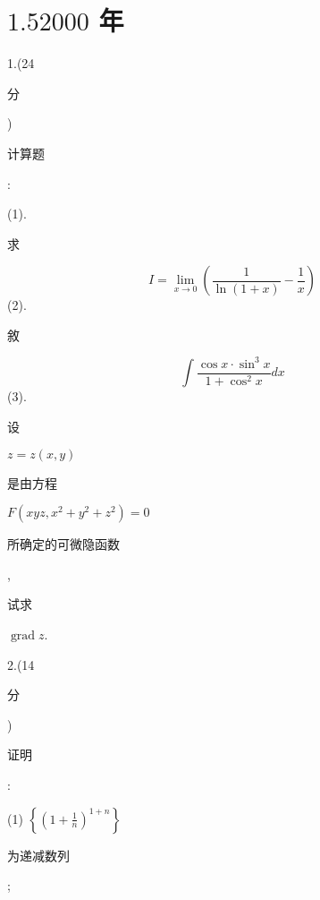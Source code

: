 \documentclass[10pt]{article}
\begin{document}
\section{$1.52000$ 年}
1.(24 \begin{CJK}{UTF8}{mj}分\end{CJK}) \begin{CJK}{UTF8}{mj}计算题\end{CJK}:

(1). \begin{CJK}{UTF8}{mj}求\end{CJK}
$$
I=\lim _{x \rightarrow 0}\left(\frac{1}{\ln (1+x)}-\frac{1}{x}\right)
$$
(2). \begin{CJK}{UTF8}{mj}敘\end{CJK}
$$
\int \frac{\cos x \cdot \sin ^{3} x}{1+\cos ^{2} x} d x
$$
(3). \begin{CJK}{UTF8}{mj}设\end{CJK} $z=z(x, y)$ \begin{CJK}{UTF8}{mj}是由方程\end{CJK} $F\left(x y z, x^{2}+y^{2}+z^{2}\right)=0$ \begin{CJK}{UTF8}{mj}所确定的可微隐函数\end{CJK}, \begin{CJK}{UTF8}{mj}试求\end{CJK} $\operatorname{grad} z$.

2.(14 \begin{CJK}{UTF8}{mj}分\end{CJK}) \begin{CJK}{UTF8}{mj}证明\end{CJK}:

(1) $\left\{\left(1+\frac{1}{n}\right)^{1+n}\right\}$ \begin{CJK}{UTF8}{mj}为递减数列\end{CJK};
\end{document}
